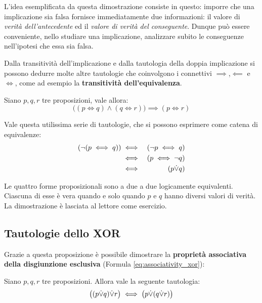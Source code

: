 L'idea esemplificata da questa dimostrazione consiste in questo: imporre che una implicazione sia falsa fornisce immediatamente due informazioni: il valore di \textit{verità dell'antecedente} ed il \textit{valore di verità del conseguente}. Dunque può essere conveniente, nello studiare una implicazione, analizzare subito le conseguenze nell'ipotesi che essa sia falsa.

Dalla transitività dell'implicazione e dalla tautologia della doppia implicazione si possono dedurre molte altre tautologie che coinvolgono i connettivi $\implies$,$\impliedby$ e $\iff$, come ad esempio la \textbf{transitività dell'equivalenza}.

\begin{propbox}
	Siano $p,q,r$ tre proposizioni, vale allora:
	\begin{equation}
		\bigl((p \iff q) \land (q \iff r)\bigr) \implies (p \iff r)
	\end{equation}
\end{propbox}

\begin{propbox}
	Vale questa utilissima serie di tautologie, che si possono esprimere come catena di equivalenze:
	\begin{eqnarray}
		(\neg(p \iff q)) &\iff& (\neg p \iff q) \label{eq:negation-implication}\\
		&\iff& (p \iff \neg q) \label{eq:negation-implication-2}\\
		&\iff& (p {\displaystyle{\dot{\vee}}} q) \label{eq:negation-implication-3}
	\end{eqnarray}
\end{propbox}

Le quattro forme proposizionali sono a due a due logicamente equivalenti. Ciascuna di esse è vera quando e solo quando $p$ e $q$ hanno diversi valori di verità. La dimostrazione è lasciata al lettore come esercizio.

\subsection{Tautologie dello XOR}
Grazie a questa proposizione è possibile dimostrare la \textbf{proprietà associativa della disgiunzione esclusiva} (Formula \ref{eq:associativity_xor}):

\begin{propbox}
	Siano $p,q,r$ tre proposizioni. Allora vale la seguente tautologia:
	\begin{equation}\label{eq:associativity_xor}
		\bigl((p {\displaystyle{\dot{\vee}}} q) {\displaystyle{\dot{\vee}}} r\bigr) \iff \bigl(p {\displaystyle{\dot{\vee}}} (q {\displaystyle{\dot{\vee}}} r)\bigr)
	\end{equation}
\end{propbox}

